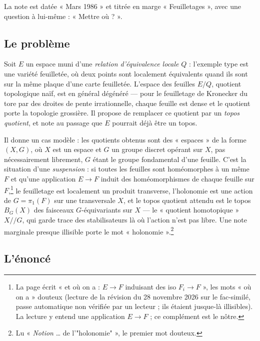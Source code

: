 \documentclass[11pt,a4paper]{article}
\begin{document}
La note est datée « Mars 1986 » et titrée en marge « Feuilletages », avec
une question à lui-même : « Mettre où ? ».

\subsection*{Le problème}

Soit $E$ un espace muni d'une \emph{relation d'équivalence locale} $Q$ :
l'exemple type est une variété feuilletée, où deux points sont localement
équivalents quand ils sont sur la même plaque d'une carte feuilletée.
L'espace des feuilles $E/Q$, quotient topologique naïf, est en général
dégénéré — pour le feuilletage de Kronecker du tore par des droites de pente
irrationnelle, chaque feuille est dense et le quotient porte la topologie
grossière. Il propose de remplacer ce quotient par un \emph{topos quotient},
et note au passage que $E$ pourrait déjà être un topos.

Il donne un cas modèle : les quotients obtenus sont des « espaces » de la
forme $(X, G)$, où $X$ est un espace et $G$ un groupe discret opérant sur $X$,
pas nécessairement librement, $G$ étant le groupe fondamental d'une feuille.
C'est la situation d'une \emph{suspension} : si toutes les feuilles sont
homéomorphes à un même $F$ et qu'une application $E \to F$ induit des
homéomorphismes de chaque feuille sur $F$,\footnote{La page écrit « et où on
a : $E \to F$ induisant des iso $F_i \to F$ », les mots « où on a » douteux
(lecture de la révision du 28 novembre 2026 sur le fac-similé, passe
automatique non vérifiée par un lecteur ; ils étaient jusque-là illisibles).
La lecture y entend une application $E \to F$ ; ce complément est le nôtre.} le feuilletage est localement
un produit transverse, l'holonomie est une action de $G = \pi_1(F)$ sur une
transversale $X$, et le topos quotient attendu est le topos $B_G(X)$ des
faisceaux $G$-équivariants sur $X$ — le « quotient homotopique » $X /\!/ G$,
qui garde trace des stabilisateurs là où l'action n'est pas libre. Une note
marginale presque illisible porte le mot « holonomie ».\footnote{Lu
« \emph{Notion} \ldots{} de l'"holonomie" », le premier mot douteux.}

\subsection*{L'énoncé}
\end{document}
